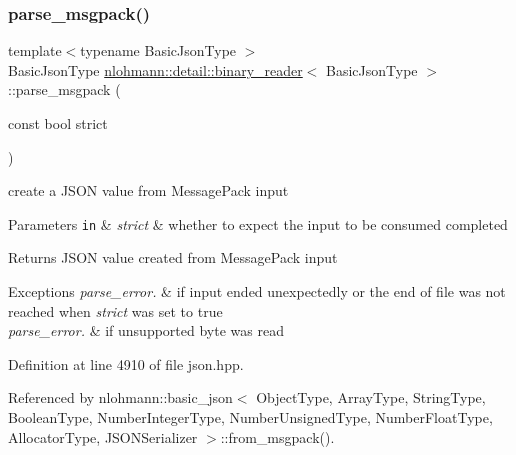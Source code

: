 \subsubsection{\texorpdfstring{parse\+\_\+msgpack()}{parse\_msgpack()}}
{\footnotesize\ttfamily template$<$typename Basic\+Json\+Type $>$ \\
Basic\+Json\+Type \hyperlink{classnlohmann_1_1detail_1_1binary__reader}{nlohmann\+::detail\+::binary\+\_\+reader}$<$ Basic\+Json\+Type $>$\+::parse\+\_\+msgpack (\begin{DoxyParamCaption}\item[{const bool}]{strict }\end{DoxyParamCaption})\hspace{0.3cm}{\ttfamily [inline]}}



create a J\+S\+ON value from Message\+Pack input 


\begin{DoxyParams}[1]{Parameters}
\mbox{\tt in}  & {\em strict} & whether to expect the input to be consumed completed \\
\hline
\end{DoxyParams}
\begin{DoxyReturn}{Returns}
J\+S\+ON value created from Message\+Pack input
\end{DoxyReturn}

\begin{DoxyExceptions}{Exceptions}
{\em parse\+\_\+error.} & if input ended unexpectedly or the end of file was not reached when {\itshape strict} was set to true \\
\hline
{\em parse\+\_\+error.} & if unsupported byte was read \\
\hline
\end{DoxyExceptions}


Definition at line 4910 of file json.\+hpp.



Referenced by nlohmann\+::basic\+\_\+json$<$ Object\+Type, Array\+Type, String\+Type, Boolean\+Type, Number\+Integer\+Type, Number\+Unsigned\+Type, Number\+Float\+Type, Allocator\+Type, J\+S\+O\+N\+Serializer $>$\+::from\+\_\+msgpack().


